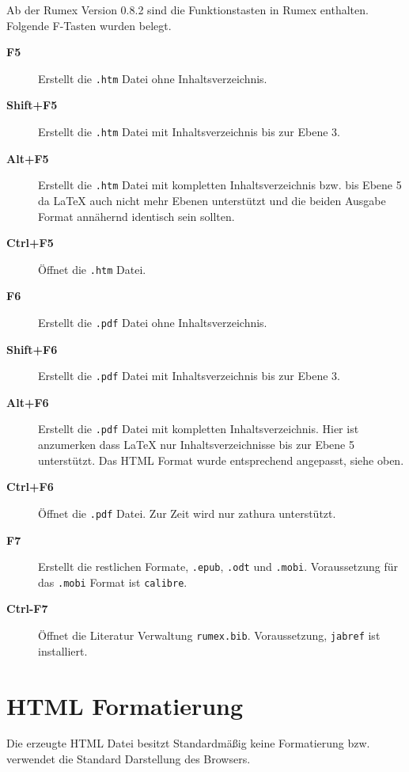 
Ab der Rumex Version 0.8.2 sind die Funktionstasten in Rumex enthalten.
Folgende F-Tasten wurden belegt.

\begin{description}
\item[\textbf{F5}]
Erstellt die \texttt{.htm} Datei ohne Inhaltsverzeichnis.
\item[\textbf{Shift+F5}]
Erstellt die \texttt{.htm} Datei mit Inhaltsverzeichnis bis zur Ebene 3.
\item[\textbf{Alt+F5}]
Erstellt die \texttt{.htm} Datei mit kompletten Inhaltsverzeichnis bzw.
bis Ebene 5 da LaTeX auch nicht mehr Ebenen unterstützt und die beiden
Ausgabe Format annähernd identisch sein sollten.
\item[\textbf{Ctrl+F5}]
Öffnet die \texttt{.htm} Datei.
\item[\textbf{F6}]
Erstellt die \texttt{.pdf} Datei ohne Inhaltsverzeichnis.
\item[\textbf{Shift+F6}]
Erstellt die \texttt{.pdf} Datei mit Inhaltsverzeichnis bis zur Ebene 3.
\item[\textbf{Alt+F6}]
Erstellt die \texttt{.pdf} Datei mit kompletten Inhaltsverzeichnis. Hier
ist anzumerken dass LaTeX nur Inhaltsverzeichnisse bis zur Ebene 5
unterstützt. Das HTML Format wurde entsprechend angepasst, siehe oben.
\item[\textbf{Ctrl+F6}]
Öffnet die \texttt{.pdf} Datei. Zur Zeit wird nur zathura unterstützt.
\item[\textbf{F7}]
Erstellt die restlichen Formate, \texttt{.epub}, \texttt{.odt} und
\texttt{.mobi}. Voraussetzung für das \texttt{.mobi} Format ist
\texttt{calibre}.
\item[\textbf{Ctrl-F7}]
Öffnet die Literatur Verwaltung \texttt{rumex.bib}. Voraussetzung,
\texttt{jabref} ist installiert.
\end{description}

\section{HTML Formatierung}\label{html-formatierung}

Die erzeugte HTML Datei besitzt Standardmäßig keine Formatierung bzw.
verwendet die Standard Darstellung des Browsers.

